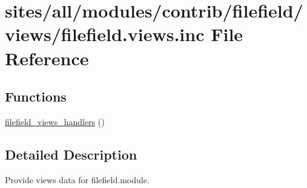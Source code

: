 \hypertarget{filefield_8views_8inc}{
\section{sites/all/modules/contrib/filefield/views/filefield.views.inc File Reference}
\label{filefield_8views_8inc}
}
\subsection*{Functions}
\begin{CompactItemize}
\item 
\hyperlink{group__views__filefield__module_g2b0a46627d72cb48f10c3ad4d4a362c4}{filefield\_\-views\_\-handlers} ()
\end{CompactItemize}


\subsection{Detailed Description}
Provide views data for filefield.module. 